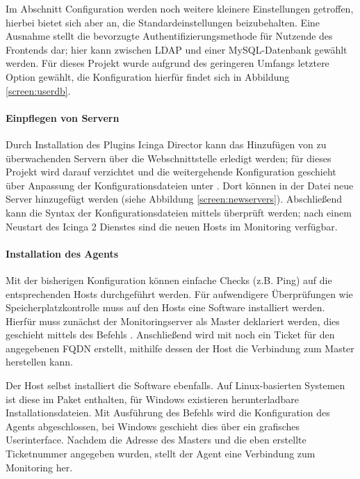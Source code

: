 Im Abschnitt \glqq{}Configuration\grqq{} werden noch weitere kleinere Einstellungen getroffen, hierbei bietet sich aber an, die Standardeinstellungen beizubehalten. Eine Ausnahme stellt die bevorzugte Authentifizierungsmethode für Nutzende des Frontends dar; hier kann zwischen LDAP und einer MySQL-Datenbank gewählt werden. Für dieses Projekt wurde aufgrund des geringeren Umfangs letztere Option gewählt, die Konfiguration hierfür findet sich in Abbildung \ref{screen:userdb}.

\paragraph{Einpflegen von Servern}
Durch Installation des Plugins \glqq{}Icinga Director\grqq{} kann das Hinzufügen von zu überwachenden Servern über die Webschnittstelle erledigt werden; für dieses Projekt wird darauf verzichtet und die weitergehende Konfiguration geschieht über Anpassung der Konfigurationsdateien unter . Dort können in der Datei  neue Server hinzugefügt werden (siehe Abbildung \ref{screen:newservers}). Abschließend kann die Syntax der Konfigurationsdateien mittels  überprüft werden; nach einem Neustart des \glqq{}Icinga 2\grqq{} Dienstes sind die neuen Hosts im Monitoring verfügbar.

\paragraph{Installation des Agents}
Mit der bisherigen Konfiguration können einfache Checks (z.B. Ping) auf die entsprechenden Hosts durchgeführt werden. Für aufwendigere Überprüfungen wie Speicherplatzkontrolle muss auf den Hosts eine Software installiert werden. Hierfür muss zunächst der Monitoringserver als \glqq{}Master\grqq{} deklariert werden, dies geschieht mittels des Befehls . Anschließend wird mit  noch ein \glqq{}Ticket\grqq{} für den angegebenen FQDN erstellt, mithilfe dessen der Host die Verbindung zum Master herstellen kann.

Der Host selbst installiert die Software ebenfalls. Auf Linux-basierten Systemen ist diese im Paket  enthalten, für Windows existieren herunterladbare Installationsdateien. Mit Ausführung des Befehls  wird die Konfiguration des Agents abgeschlossen, bei Windows geschieht dies über ein grafisches Userinterface. Nachdem die Adresse des Masters und die eben erstellte Ticketnummer angegeben wurden, stellt der Agent eine Verbindung zum Monitoring her.

